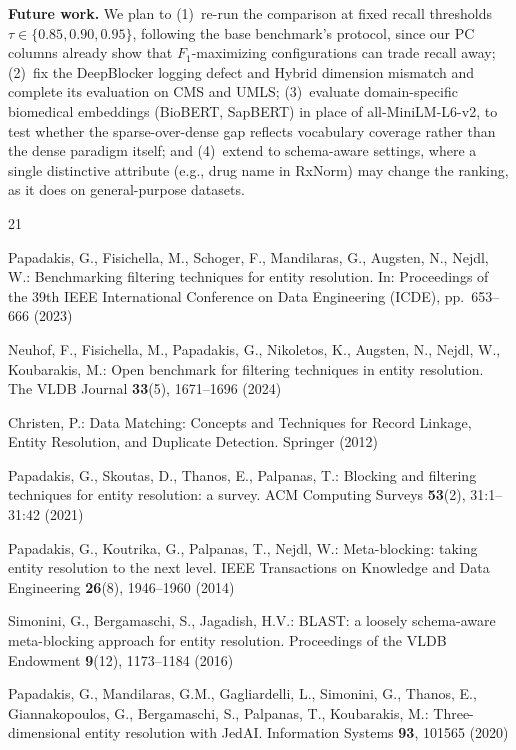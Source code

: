 \documentclass[runningheads]{llncs}
\begin{document}
\textbf{Future work.} We plan to (1)~re-run the comparison at fixed recall thresholds
$\tau \in \{0.85, 0.90, 0.95\}$, following the base benchmark's protocol, since our PC columns
already show that $F_1$-maximizing configurations can trade recall away; (2)~fix the
DeepBlocker logging defect and Hybrid dimension mismatch and complete its evaluation on CMS and
UMLS; (3)~evaluate domain-specific biomedical embeddings (BioBERT, SapBERT) in place of
all-MiniLM-L6-v2, to test whether the sparse-over-dense gap reflects vocabulary coverage rather
than the dense paradigm itself; and (4)~extend to schema-aware settings, where a single
distinctive attribute (e.g., drug name in RxNorm) may change the ranking, as it does on
general-purpose datasets.
%
%

\begin{thebibliography}{21}

Papadakis, G., Fisichella, M., Schoger, F., Mandilaras, G., Augsten, N., Nejdl, W.: Benchmarking filtering techniques for entity resolution. In: Proceedings of the 39th IEEE International Conference on Data Engineering (ICDE), pp.~653--666 (2023)

Neuhof, F., Fisichella, M., Papadakis, G., Nikoletos, K., Augsten, N., Nejdl, W., Koubarakis, M.: Open benchmark for filtering techniques in entity resolution. The VLDB Journal \textbf{33}(5), 1671--1696 (2024)

Christen, P.: Data Matching: Concepts and Techniques for Record Linkage, Entity Resolution, and Duplicate Detection. Springer (2012)

Papadakis, G., Skoutas, D., Thanos, E., Palpanas, T.: Blocking and filtering techniques for entity resolution: a survey. ACM Computing Surveys \textbf{53}(2), 31:1--31:42 (2021)

Papadakis, G., Koutrika, G., Palpanas, T., Nejdl, W.: Meta-blocking: taking entity resolution to the next level. IEEE Transactions on Knowledge and Data Engineering \textbf{26}(8), 1946--1960 (2014)

Simonini, G., Bergamaschi, S., Jagadish, H.V.: BLAST: a loosely schema-aware meta-blocking approach for entity resolution. Proceedings of the VLDB Endowment \textbf{9}(12), 1173--1184 (2016)

Papadakis, G., Mandilaras, G.M., Gagliardelli, L., Simonini, G., Thanos, E., Giannakopoulos, G., Bergamaschi, S., Palpanas, T., Koubarakis, M.: Three-dimensional entity resolution with JedAI. Information Systems \textbf{93}, 101565 (2020)


\end{thebibliography}
\end{document}
